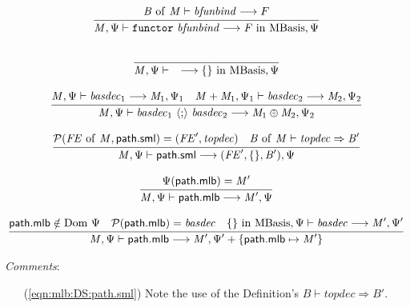\documentclass[draft]{article}
\renewcommand{\mit}[1]{\mathit{#1}}
\newcommand{\mrm}[1]{\mathrm{#1}}
\newcommand{\mtt}[1]{\mathtt{#1}}
\newcommand{\mcal}[1]{\mathcal{#1}}
\newcommand{\msf}[1]{\mathsf{#1}}
\newcommand{\infrule}[2]{{\frac{\displaystyle\strut{#1}}{\displaystyle\strut{#2}}}}
\newcommand{\judge}[2]{\infrule{#1}{#2}}
\begin{document}
\begin{equation}
\judge{
\mit{B}~\mrm{of}~\mit{M} \vdash \mit{bfunbind} \longrightarrow F
}{
\mit{M}, \Psi  \vdash \mtt{functor}~ \mit{bfunbind}
\longrightarrow \mit{F} ~\mrm{in}~ \mrm{MBasis}, \Psi
}
\end{equation}

\begin{equation}
\judge{
}{
\mit{M}, \Psi  \vdash \quad \longrightarrow \{\} ~\mrm{in}~ \mrm{MBasis}, \Psi
}
\end{equation}

\begin{equation}
\judge{
\mit{M}, \Psi  \vdash \mit{basdec}_1 \longrightarrow \mit{M}_1, \Psi_1 \quad
\mit{M} + \mit{M}_1, \Psi_1  \vdash \mit{basdec}_2 \longrightarrow \mit{M}_2, \Psi_2 
}{
\mit{M}, \Psi  \vdash \mit{basdec}_1 ~\langle\mtt{;}\rangle~ \mit{basdec}_2 \longrightarrow \mit{M}_1 \oplus \mit{M}_2, \Psi_2
}
\end{equation}

\begin{equation}
\label{eqn:mlb:DS:path.sml}
\judge{
\mcal{P}(\mit{FE}~\mrm{of}~\mit{M}, \msf{path.sml}) = (\mit{FE}', \mit{topdec}) \quad
\mit{B}~\mrm{of}~\mit{M} \vdash \mit{topdec} \Rightarrow \mit{B}'
}{
\mit{M}, \Psi  \vdash \msf{path.sml}  \longrightarrow (\mit{FE}',\{\},\mit{B}'), \Psi
}
\end{equation}

\begin{equation}
\judge{
\Psi(\msf{path.mlb}) = \mit{M}'
}{
\mit{M}, \Psi  \vdash \msf{path.mlb}  \longrightarrow \mit{M}', \Psi
}
\end{equation}

\begin{equation}
\judge{
\msf{path.mlb} \notin \mrm{Dom}~\Psi \quad
\mcal{P}(\msf{path.mlb}) = \mit{basdec} \quad
\{\} ~\mrm{in}~ \mrm{MBasis}, \Psi  \vdash \mit{basdec} \longrightarrow \mit{M}', \Psi'
}{
\mit{M}, \Psi  \vdash \msf{path.mlb}  \longrightarrow \mit{M}', \Psi' + \{\msf{path.mlb} \mapsto \mit{M}'\} 
}
\end{equation}

\begin{samepage}
\noindent
\textit{Comments}:
\begin{itemize}
\item[(\ref{eqn:mlb:DS:path.sml})] 
Note the use of the Definition's 
$\mit{B} \vdash \mit{topdec} \Rightarrow \mit{B}'$.
\end{itemize}
\end{samepage}
\end{document}
